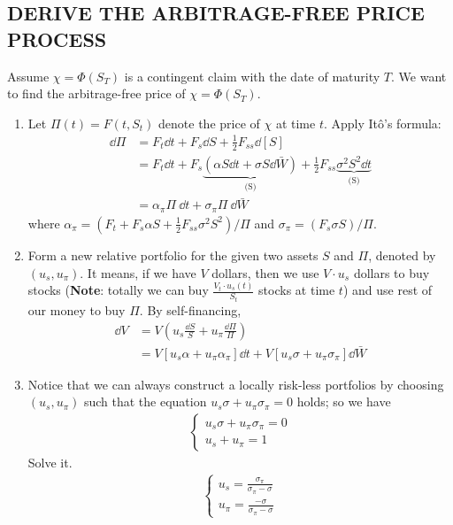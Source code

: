 \subsection*{DERIVE THE ARBITRAGE-FREE PRICE PROCESS} 
Assume $\chi = \Phi(S_T)$ is a contingent claim with the date of maturity $T$. We want to find the arbitrage-free price of $\chi = \Phi(S_T)$. 
	\begin{enumerate}
		\item Let $\Pi(t) = F(t, S_t)$ denote the price of $\chi$ at time $t$. Apply It\^o's formula:
		\begin{align*}
			\dd \Pi &= F_t \dd t + F_s \dd S + \frac{1}{2}F_{ss} \dd [S] \\
			&= F_t \dd t + F_s\underbrace{( \alpha S \dd t + \sigma S \dd \bar{W} )}_{\text{(S)}} + \frac{1}{2}F_{ss} \underbrace{\sigma^2 S^2 \dd t}_{\text{(S)}} \\
			&= \alpha_\pi \Pi  \ \dd t + \sigma_\pi \Pi \ \dd \bar{W}   
		\end{align*} 
		where $\alpha_\pi = (F_t + F_s \alpha S + \frac{1}{2}F_{ss} \sigma^2 S^2)/\Pi$ and $\sigma_\pi = (F_s \sigma S)/\Pi$.
		
		\item Form a new relative portfolio for the given two assets $S$ and $\Pi$, denoted by $(u_s, u_\pi)$. It means, if we have $V$ dollars, then we use $V\cdot u_s$ dollars to buy stocks (\textbf{Note}: totally we can buy $\frac{V_t \cdot u_s(t)}{S_t}$ stocks at time $t$) and use rest of our money to buy $\Pi$. By self-financing,
		\begin{align*}
			\dd V &= V (  u_s \frac{\dd S}{S}  + u_\pi \frac{\dd \Pi}{\Pi}  ) \\
			&= V \left[  u_s \alpha + u_\pi \alpha_\pi \right] \dd t + V \left[ u_s \sigma + u_\pi \sigma_\pi \right] \dd \bar{W}
		\end{align*}
		
		\item Notice that we can always construct a locally risk-less portfolios by choosing $(u_s, u_\pi)$ such that the equation $u_s \sigma + u_\pi \sigma_\pi = 0$ holds; so we have
		\begin{align*}
			\begin{cases}
			u_s \sigma + u_\pi \sigma_\pi = 0 \\
			u_s + u_\pi = 1
			\end{cases}
		\end{align*}
		Solve it. 
		\begin{align*}
			\begin{cases}
			u_s  =  \frac{\sigma_\pi}{\sigma_\pi - \sigma} \\
			u_\pi = \frac{-\sigma}{\sigma_\pi - \sigma} 
			\end{cases} \tag{1}
		\end{align*}
		

\end{enumerate}
